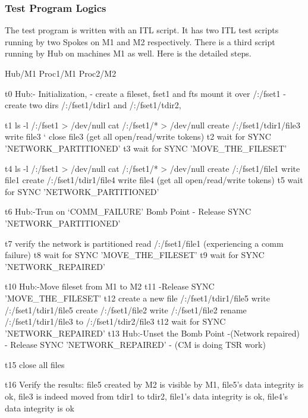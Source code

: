 \pagebreak 

\subsubsection {Test Program Logics}

The test program is written with an ITL script. It has two ITL test scripts running by two 
Spokes on M1 and M2 respectively. There is a third script running by Hub on machines M1
as well. Here is the detailed steps. 
\begin{programexample}
    Hub/M1		Proc1/M1			Proc2/M2
	 	 
t0  Hub:- Initialization,
	- create a fileset, fset1 and fts mount it over /:/fset1
	- create two dirs /:/fset1/tdir1 and /:/fset1/tdir2, 

t1							ls -l /:/fset1  > /dev/null
							cat /:/fset1/* > /dev/null
							create /:/fset1/tdir1/file3
							write file3
	`						close file3
							(get all open/read/write tokens)
t2							wait for SYNC 'NETWORK_PARTITIONED'
t3							wait for SYNC 'MOVE_THE_FILESET'

t4			ls -l /:/fset1 > /dev/null 				
			cat /:/fset1/* > /dev/null
			create /:/fset1/file1
			write file1
			create /:/fset1/tdir1/file4
			write file4
			(get all open/read/write tokens)
t5			wait for SYNC 'NETWORK_PARTITIONED'

t6  Hub:-Trun on `COMM_FAILURE' Bomb Point
	- Release SYNC 'NETWORK_PARTITIONED'

t7			verify the network is partitioned
			read /:/fset1/file1 
			(experiencing a comm failure)
t8			wait for SYNC 'MOVE_THE_FILESET'
t9			wait for SYNC 'NETWORK_REPAIRED'
		
t10 Hub:-Move fileset from M1 to M2
t11	-Release SYNC 'MOVE_THE_FILESET'
t12							create a new file /:/fset1/tdir1/file5
							write /:/fset1/tdir1/file5
							create /:/fset1/file2
							write /:/fset1/file2
							rename /:/fset1/tdir1/file3 to 
							       /:/fset1/tdir2/file3
t12							wait for SYNC 'NETWORK_REPAIRED'
t13 Hub:-Unset the Bomb Point 
	-(Network repaired)
	- Release SYNC 'NETWORK_REPAIRED'
	- (CM is doing TSR work)

t15							close all files

t16			Verify the results:
			file5 created by M2 is visible by M1,  
			file5's data integrity is ok,
			file3 is indeed moved from tdir1 to tdir2,	
			file1's data integrity is ok,
			file4's data integrity is ok
\end{programexample}

